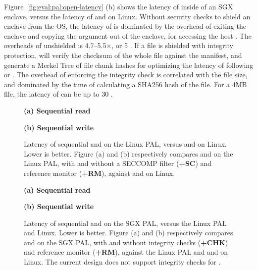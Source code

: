 Figure~\ref{fig:eval:pal:open-latency} (b) shows the latency of  inside of an SGX enclave, versus the latency of 
 and  on Linux.
Without security checks to shield an enclave from the OS,
the latency of  is dominated by the overhead of exiting the enclave and copying the argument out of the enclave,
for accessing the host \linuxapis{}.
The overheads of unshielded  is 4.7--5.5$\times$, or \roughly{}5 \usec{}.
If a file is shielded with integrity protection,
 will verify the checksum of the whole file against the manifest, and generate a Merkel Tree of file chunk hashes
for optimizing the latency of following  or .
The overhead of enforcing the integrity check is correlated with the file size, and dominated by the time of
calculating a SHA256 hash of the file.
For a 4MB file, the latency of  can be up to \roughly{}30 \msec{}.






\begin{figure*}[t!]
\centering
\footnotesize
{}
\parbox{0.49\textwidth}{\centering\bf (a) Sequential read}
\parbox{0.49\textwidth}{\centering\bf (b) Sequential write}
\caption{Latency of sequential  and  on the Linux PAL,
versus  and  on Linux.
Lower is better.
Figure (a) and (b) respectively compares  and  on the Linux PAL,
with and without a SECCOMP filter ({\bf +SC})
and reference monitor ({\bf +RM}), against  and  on Linux.}
\label{fig:eval:pal:read-write-latency}
\end{figure*}

\begin{figure*}[t!]
\centering
\footnotesize
{}
\parbox{0.49\textwidth}{\centering\bf (a) Sequential read}
\parbox{0.49\textwidth}{\centering\bf (b) Sequential write}
\caption{Latency of sequential  and  on the SGX PAL,
versus the Linux PAL and Linux.
Lower is better.
Figure (a) and (b) respectively compares  and  on the SGX PAL,
with and without integrity checks ({\bf +CHK})
and reference monitor ({\bf +RM}), against the Linux PAL and  and  on Linux. The current design does not support integrity checks for .}
\label{fig:eval:pal:sgx-read-write-latency}
\end{figure*}


